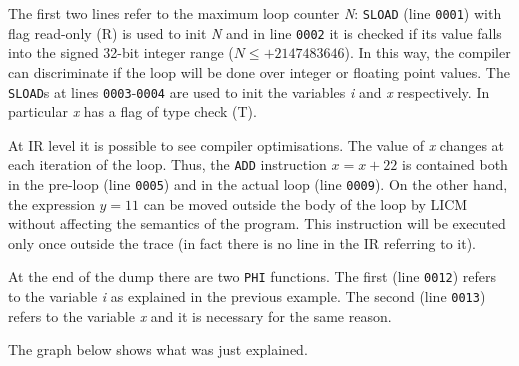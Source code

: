 \noindent
The first two lines refer to the maximum loop counter \textit{N}: \texttt{SLOAD} (line \texttt{0001}) with flag read-only (R) is used to init \textit{N} and in line \texttt{0002} it is checked if its value falls into the signed 32-bit integer range ($N\leq+2147483646$). In this way, the compiler can discriminate if the loop will be done over integer or floating point values. The \texttt{SLOAD}s at lines \texttt{0003}-\texttt{0004} are used to init the variables \textit{i} and \textit{x} respectively. In particular \textit{x} has a flag of type check (T).

At IR level it is possible to see compiler optimisations. The value of \textit{x} changes at each iteration of the loop. Thus, the \texttt{ADD} instruction $x=x+22$ is contained both in the pre-loop (line \texttt{0005}) and in the actual loop (line \texttt{0009}). On the other hand, the expression $y=11$ can be moved outside the body of the loop by LICM without affecting the semantics of the program. This instruction will be executed only once outside the trace (in fact there is no line in the IR referring to it).

At the end of the dump there are two \texttt{PHI} functions. The first (line \texttt{0012}) refers to the variable \textit{i} as explained in the previous example. The second (line \texttt{0013}) refers to the variable \textit{x} and it is necessary for the same reason.

The graph below shows what was just explained.

